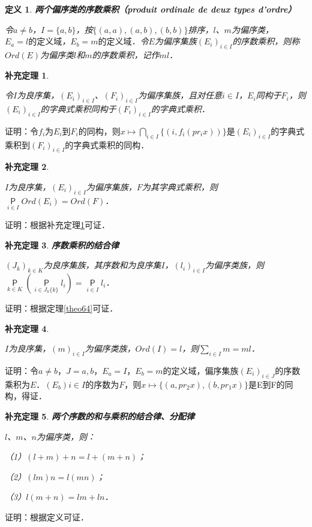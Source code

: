\documentclass[12pt, a4paper, oneside]{book}
\newtheorem{cor}{补充定理}
\newtheorem{de}{定义}
\begin{document}
			\begin{de}
				\textbf{两个偏序类的序数乘积（produit ordinale de deux types d'ordre）}
				\par
				令$a\neq b$，$I=\{a, b\}$，按$\{(a, a), (a, b), (b, b)\}$排序，$l$、$m$为偏序类，$E_a=l\text{的定义域}$，$E_b=m\text{的定义域}$．令$E$为偏序集族$(E_i)_{i\in I}$的序数乘积，则称$Ord(E)$为偏序类$l$和$m$的序数乘积，记作$ml$．
			\end{de}
			
			\begin{cor}\label{cor241}
				\hfill\par
				令$I$为良序集，$(E_i)_{i\in I}$、$(F_i)_{i\in I}$为偏序集族，且对任意$i\in I$，$E_i$同构于$F_i$，则$(E_i)_{i\in I}$的字典式乘积同构于$(F_i)_{i\in I}$的字典式乘积．
			\end{cor}
			证明：令$f_i$为$E_i$到$F_i$的同构，则$x\mapsto\bigcap\limits_{i\in I}\{(i, f_i(pr_ix))\}$是$(E_i)_{i\in I}$的字典式乘积到$(F_i)_{i\in I}$的字典式乘积的同构．
			
			\begin{cor}\label{cor242}
				\hfill\par
				$I$为良序集，$(E_i)_{i\in I}$为偏序集族，$F$为其字典式乘积，则$\mathop{\mathsf{P}}\limits_{i\in I}Ord(E_i)=Ord(F)$．
			\end{cor}
			证明：根据补充定理\ref{cor241}可证．
			
			\begin{cor}\label{cor243}
				\textbf{序数乘积的结合律}
				\par
				$(J_k)_{k\in K}$为良序集族，其序数和为良序集$I$，$(l_i)_{i\in I}$为偏序类族，则$\mathop{\mathsf{P}}\limits_{k\in K}(\mathop{\mathsf{P}}\limits_{i\in J_k\{k\}}l_i)=\mathop{\mathsf{P}}\limits_{i\in I}l_i$．
			\end{cor}
			证明：根据定理\ref{theo64}可证．
			
			\begin{cor}\label{cor244}
				\hfill\par
				$I$为良序集，$(m)_{i\in I}$为偏序类族，$Ord(I)=l$，则$\sum\limits_{i\in I}m=ml$．
			\end{cor}
			证明：令$a\neq b$，$J={a, b}$，$E_a=I$，$E_b=m$的定义域，偏序集族$(E_i)_{i\in J}$的序数乘积为$E$．$(E_b)i\in I$的序数为$F$，则$x\mapsto\{(a, pr_2x), (b, pr_1x)\}$是E到F的同构，得证．
			
			\begin{cor}\label{cor245}
				\textbf{两个序数的和与乘积的结合律、分配律}
				\par
				$l$、$m$、$n$为偏序类，则：
				\par
				（1）$(l+m)+n=l+(m+n)$；
				\par
				（2）$(lm)n=l(mn)$；
				\par
				（3）$l(m+n)=lm+ln$．
			\end{cor}
			证明：根据定义可证．
			
\end{document}
